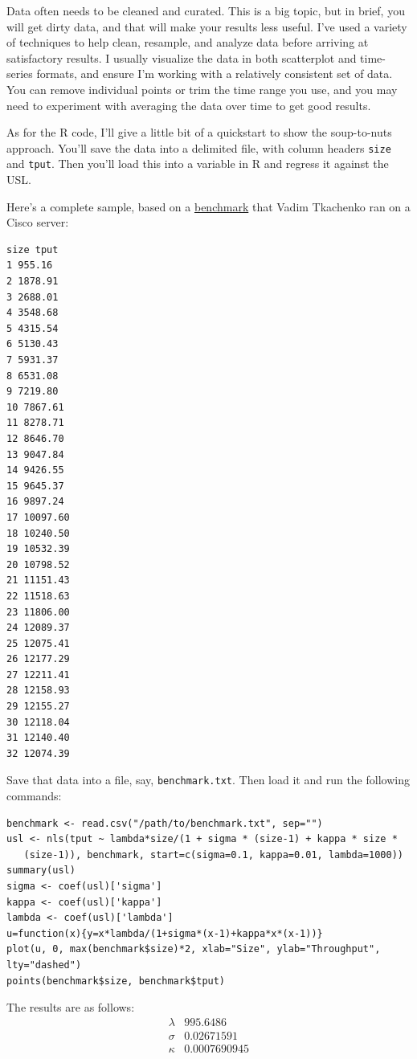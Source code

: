 \documentclass{vivid_layout}
\begin{document}
Data often needs to be cleaned and curated. This is a big topic, but in brief,
you will get dirty data, and that will make your results less useful.  I've used
a variety of techniques to help clean, resample, and analyze data before
arriving at satisfactory results.  I usually visualize the data in both
scatterplot and time-series formats, and ensure I'm working with a relatively
consistent set of data. You can remove individual points or trim the time range
you use, and you may need to experiment with averaging the data over time to get
good results.

As for the R code, I'll give a little bit of a quickstart to show the
soup-to-nuts approach.  You'll save the data into a delimited file, with column
headers \texttt{size} and \texttt{tput}. Then you'll load this into a variable
in R and regress it against the USL.

Here's a complete sample, based on a
\href{https://www.percona.com/docs/wiki/benchmark:cisco:scale:start}{benchmark}
that Vadim Tkachenko ran on a Cisco server:

\newpage
\begin{verbatim}
size tput
1 955.16
2 1878.91
3 2688.01
4 3548.68
5 4315.54
6 5130.43
7 5931.37
8 6531.08
9 7219.80
10 7867.61
11 8278.71
12 8646.70
13 9047.84
14 9426.55
15 9645.37
16 9897.24
17 10097.60
18 10240.50
19 10532.39
20 10798.52
21 11151.43
22 11518.63
23 11806.00
24 12089.37
25 12075.41
26 12177.29
27 12211.41
28 12158.93
29 12155.27
30 12118.04
31 12140.40
32 12074.39
\end{verbatim}

Save that data into a file, say, \texttt{benchmark.txt}. Then load it and run the following commands:

\begin{verbatim}
benchmark <- read.csv("/path/to/benchmark.txt", sep="")
usl <- nls(tput ~ lambda*size/(1 + sigma * (size-1) + kappa * size *
   (size-1)), benchmark, start=c(sigma=0.1, kappa=0.01, lambda=1000))
summary(usl)
sigma <- coef(usl)['sigma']
kappa <- coef(usl)['kappa']
lambda <- coef(usl)['lambda']
u=function(x){y=x*lambda/(1+sigma*(x-1)+kappa*x*(x-1))}
plot(u, 0, max(benchmark$size)*2, xlab="Size", ylab="Throughput", lty="dashed")
points(benchmark$size, benchmark$tput)
\end{verbatim}

The results are as follows:
\[
\begin{array}{ll}
			\lambda&995.6486 \\
     \sigma & 0.02671591 \\
			       \kappa & 0.0007690945 \\
\end{array}
\]
\end{document}
